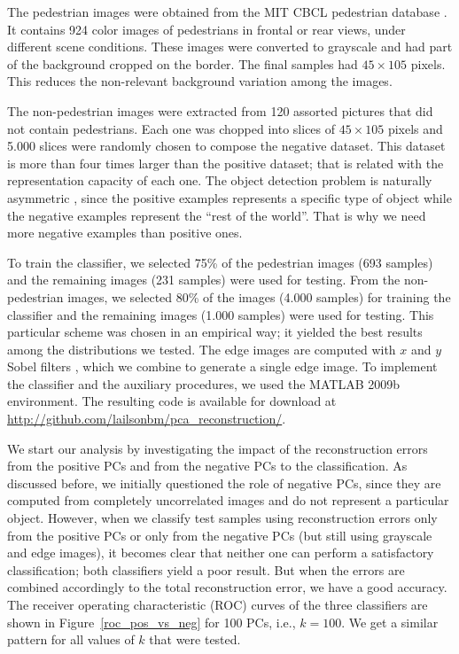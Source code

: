 \documentclass[10pt, conference, compsocconf]{IEEEtran}
\begin{document}
The pedestrian images were obtained from the MIT CBCL pedestrian database \cite{cbcl}. It contains 924 color images of pedestrians in frontal or rear views, under different scene conditions. These images were converted to grayscale and had part of the background cropped on the border. The final samples had $45 \times 105$ pixels. This reduces the non-relevant background variation among the images.

The non-pedestrian images were extracted from 120 assorted pictures that did not contain pedestrians. Each one was chopped into slices of $45 \times 105$ pixels and 5.000 slices were randomly chosen to compose the negative dataset. This dataset is more than four times larger than the positive dataset; that is related with the representation capacity of each one. The object detection problem is naturally asymmetric \cite{jiang09}, since the positive examples represents a specific type of object while the negative examples represent the ``rest of the world''. That is why we need more negative examples than positive ones.

To train the classifier, we selected 75\% of the pedestrian images (693 samples) and the remaining images (231 samples) were used  for testing. From the non-pedestrian images, we selected 80\% of the images (4.000 samples) for training the classifier and the remaining images (1.000 samples) were used for testing. This particular scheme was chosen in an empirical way; it yielded the best results among the distributions we tested. The edge images are computed with $x$ and $y$ Sobel filters \cite{gonzalez07}, which we combine to generate a single edge image. To implement the classifier and the auxiliary procedures, we used the MATLAB 2009b environment. The resulting code is available for download at \url{http://github.com/lailsonbm/pca_reconstruction/}.

We start our analysis by investigating the impact of the reconstruction errors from the positive PCs and from the negative PCs to the classification. As discussed before, we initially questioned the role of negative PCs, since they are computed from completely uncorrelated images and do not represent a particular object. However, when we classify test samples using reconstruction errors only from the positive PCs or only from the negative PCs (but still using grayscale and edge images), it becomes clear that neither one can perform a satisfactory classification; both classifiers yield a poor result. But when the errors are combined accordingly to the total reconstruction error, we have a good accuracy. The receiver operating characteristic (ROC) curves of the three classifiers are shown in Figure~\ref{roc_pos_vs_neg} for 100 PCs, i.e., $k = 100$. We get a similar pattern for all values of $k$ that were tested.
\end{document}
